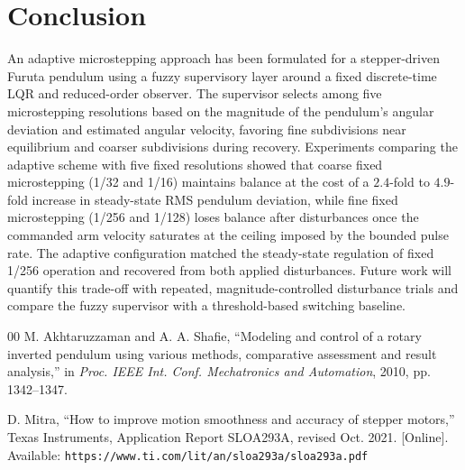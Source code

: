 \documentclass[conference]{IEEEtran}
\begin{document}
\section{Conclusion}
An adaptive microstepping approach has been formulated for a stepper-driven Furuta pendulum using a fuzzy supervisory layer around a fixed discrete-time LQR and reduced-order observer. The supervisor selects among five microstepping resolutions based on the magnitude of the pendulum's angular deviation and estimated angular velocity, favoring fine subdivisions near equilibrium and coarser subdivisions during recovery. Experiments comparing the adaptive scheme with five fixed resolutions showed that coarse fixed microstepping (1/32 and 1/16) maintains balance at the cost of a $2.4$-fold to $4.9$-fold increase in steady-state RMS pendulum deviation, while fine fixed microstepping (1/256 and 1/128) loses balance after disturbances once the commanded arm velocity saturates at the ceiling imposed by the bounded pulse rate. The adaptive configuration matched the steady-state regulation of fixed 1/256 operation and recovered from both applied disturbances. Future work will quantify this trade-off with repeated, magnitude-controlled disturbance trials and compare the fuzzy supervisor with a threshold-based switching baseline.


\begin{thebibliography}{00}
M. Akhtaruzzaman and A. A. Shafie, ``Modeling and control of a rotary inverted pendulum using various methods, comparative assessment and result analysis,'' in \emph{Proc. IEEE Int. Conf. Mechatronics and Automation}, 2010, pp. 1342--1347.

D. Mitra, ``How to improve motion smoothness and accuracy of stepper motors,'' Texas Instruments, Application Report SLOA293A, revised Oct. 2021. [Online]. Available: \texttt{https://www.ti.com/lit/an/sloa293a/sloa293a.pdf}
\end{thebibliography}
\end{document}
